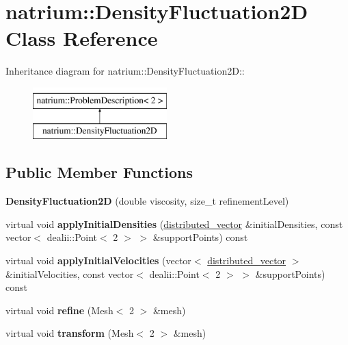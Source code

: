 \hypertarget{classnatrium_1_1DensityFluctuation2D}{
\section{natrium::DensityFluctuation2D Class Reference}
\label{classnatrium_1_1DensityFluctuation2D}
}
Inheritance diagram for natrium::DensityFluctuation2D::\begin{figure}[H]
\begin{center}
\leavevmode
\includegraphics[height=2cm]{classnatrium_1_1DensityFluctuation2D}
\end{center}
\end{figure}
\subsection*{Public Member Functions}
\begin{DoxyCompactItemize}
\item 
\hypertarget{classnatrium_1_1DensityFluctuation2D_aac8ea303ea740e73868cd1ee431e182f}{
{\bfseries DensityFluctuation2D} (double viscosity, size\_\-t refinementLevel)}
\label{classnatrium_1_1DensityFluctuation2D_aac8ea303ea740e73868cd1ee431e182f}

\item 
\hypertarget{classnatrium_1_1DensityFluctuation2D_a7d345499b56b65e0b107defcd5c89e2e}{
virtual void {\bfseries applyInitialDensities} (\hyperlink{namespacenatrium_a903d2b92917f582f2ff05f52160ab811}{distributed\_\-vector} \&initialDensities, const vector$<$ dealii::Point$<$ 2 $>$ $>$ \&supportPoints) const }
\label{classnatrium_1_1DensityFluctuation2D_a7d345499b56b65e0b107defcd5c89e2e}

\item 
\hypertarget{classnatrium_1_1DensityFluctuation2D_a217a8d3635da81fb0350671a86142b57}{
virtual void {\bfseries applyInitialVelocities} (vector$<$ \hyperlink{namespacenatrium_a903d2b92917f582f2ff05f52160ab811}{distributed\_\-vector} $>$ \&initialVelocities, const vector$<$ dealii::Point$<$ 2 $>$ $>$ \&supportPoints) const }
\label{classnatrium_1_1DensityFluctuation2D_a217a8d3635da81fb0350671a86142b57}

\item 
\hypertarget{classnatrium_1_1DensityFluctuation2D_af158622965391ef1c856587d9fb993b7}{
virtual void {\bfseries refine} (Mesh$<$ 2 $>$ \&mesh)}
\label{classnatrium_1_1DensityFluctuation2D_af158622965391ef1c856587d9fb993b7}

\item 
\hypertarget{classnatrium_1_1DensityFluctuation2D_a7b7215ba2073404b076a517ffe2c34ea}{
virtual void {\bfseries transform} (Mesh$<$ 2 $>$ \&mesh)}
\label{classnatrium_1_1DensityFluctuation2D_a7b7215ba2073404b076a517ffe2c34ea}

\end{DoxyCompactItemize}


